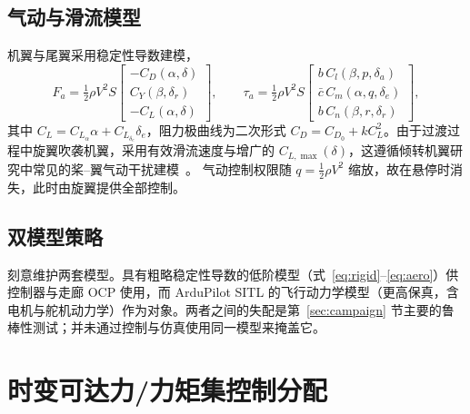 \documentclass[UTF8,a4paper,11pt]{ctexart}
\begin{document}
\subsection{气动与滑流模型}\label{sec:aero}
机翼与尾翼采用稳定性导数建模，
\begin{equation}
F_a=\tfrac12\rho V^2 S
 \begin{bmatrix} -C_D(\alpha,\delta)\\ C_Y(\beta,\delta_r)\\ -C_L(\alpha,\delta)\end{bmatrix},
\qquad
\tau_a=\tfrac12\rho V^2 S
 \begin{bmatrix} b\, C_l(\beta,p,\delta_a)\\ \bar c\, C_m(\alpha,q,\delta_e)\\ b\, C_n(\beta,r,\delta_r)\end{bmatrix},
\label{eq:aero}
\end{equation}
其中 $C_L=C_{L_\alpha}\alpha+C_{L_{\delta_e}}\delta_e$，阻力极曲线为二次形式 $C_D=C_{D_0}+k C_L^2$。由于过渡过程中旋翼吹袭机翼，采用有效滑流速度与增广的 $C_{L,\max}(\delta)$，这遵循倾转机翼研究中常见的桨--翼气动干扰建模~\cite{rohr2021nmpc,mancinelli2025unified}。
气动控制权限随 $q=\tfrac12\rho V^2$ 缩放，故在悬停时消失，此时由旋翼提供全部控制。

\subsection{双模型策略}\label{sec:twomodel}
刻意维护两套模型。具有粗略稳定性导数的低阶模型（式~\eqref{eq:rigid}--\eqref{eq:aero}）供控制器与走廊 OCP 使用，而 ArduPilot SITL 的飞行动力学模型（更高保真，含电机与舵机动力学）作为对象。两者之间的失配是第~\ref{sec:campaign} 节主要的鲁棒性测试；并未通过控制与仿真使用同一模型来掩盖它。

\section{时变可达力/力矩集控制分配}\label{sec:aws}
\end{document}
